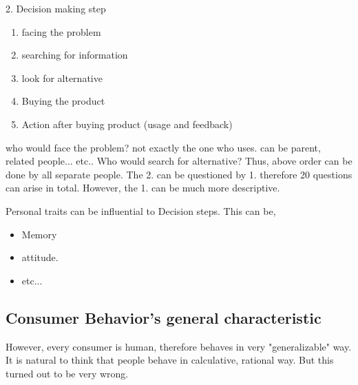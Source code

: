 \documentclass[12pt]{article}
\begin{document}
2. Decision making step
\begin{enumerate}
	\item facing the problem
	\item searching for information
	\item look for alternative
	\item Buying the product
	\item Action after buying product (usage and feedback)

\end{enumerate}

who would face the problem? not exactly the one who uses. can be parent, related people... etc..
Who would search for alternative? Thus, above order can be done by all separate people.
The 2. can be questioned by 1. therefore 20 questions can arise in total. However, the 1. can be much more descriptive.

Personal traits can be influential to Decision steps. This can be,
\begin{itemize}
	\item Memory
	\item attitude.
	\item etc...
\end{itemize}

\subsection{Consumer Behavior's general characteristic}

However, every consumer is human, therefore behaves in very "generalizable" way. It is natural to think that people behave in calculative, rational way. But this turned out to be very wrong.
\end{document}

